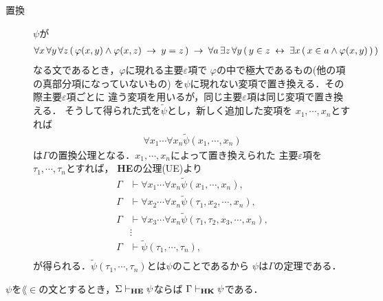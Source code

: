 \begin{sketch}
\begin{description}
			\item[置換] $\psi$が
				\begin{align}
					\forall x\, \forall y\, \forall z\, 
					(\, \varphi(x,y) \wedge \varphi(x,z)
					\hspace{0.25em}\rightarrow\hspace{0.25em} y = z\, )
					\hspace{0.25em}\rightarrow\hspace{0.25em} \forall a\, \exists z\, \forall y\,
					(\, y \in z \hspace{0.25em}\leftrightarrow\hspace{0.25em} \exists x\, (\, x \in a \wedge 
					\varphi(x,y)\, )\, )
				\end{align}
				なる文であるとき，$\varphi$に現れる主要$\varepsilon$項で
				$\varphi$の中で極大であるもの(他の項の真部分項になっていないもの)
				を$\psi$に現れない変項で置き換える．その際主要$\varepsilon$項ごとに
				違う変項を用いるが，同じ主要$\varepsilon$項は同じ変項で置き換える．
				そうして得られた式を$\tilde{\psi}$とし，新しく追加した変項を
				$x_{1},\cdots,x_{n}$とすれば
				\begin{align}
					\forall x_{1} \cdots \forall x_{n} \tilde{\psi}(x_{1},\cdots,x_{n})
				\end{align}
				は$\Gamma$の置換公理となる．$x_{1},\cdots,x_{n}$によって置き換えられた
				主要$\varepsilon$項を$\tau_{1},\cdots,\tau_{n}$とすれば，
				{\bf HE}の公理(UE)より
				\begin{align}
					\Gamma &\vdash \forall x_{1} \cdots \forall x_{n} \tilde{\psi}(x_{1},\cdots,x_{n}), \\
					\Gamma &\vdash \forall x_{2} \cdots \forall x_{n} \tilde{\psi}(\tau_{1},x_{2},\cdots,x_{n}), \\
					\Gamma &\vdash \forall x_{3} \cdots \forall x_{n} \tilde{\psi}(\tau_{1},\tau_{2},x_{3},\cdots,x_{n}), \\
					&\vdots \\
					\Gamma &\vdash \tilde{\psi}(\tau_{1},\cdots,\tau_{n}), \\
				\end{align}
				が得られる．$\tilde{\psi}(\tau_{1},\cdots,\tau_{n})$とは$\psi$のことであるから
				$\psi$は$\Gamma$の定理である．
				\QED
		\end{description}
	\end{sketch}
	
	\begin{screen}
		\begin{metathm}
			$\psi$を$\lang{\in}$の文とするとき，$\Sigma \vdash_{{\scriptsize \mbox{{\bf HE}}}} \psi$ならば
			$\Gamma \vdash_{{\scriptsize \mbox{{\bf HK}}}} \psi$である．
		\end{metathm}
	\end{screen}
	
